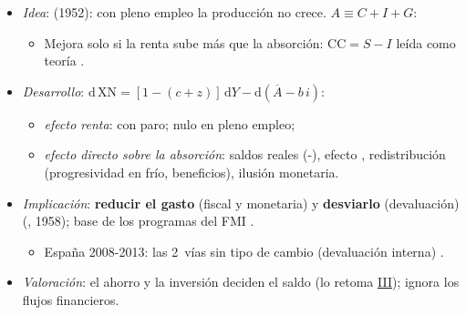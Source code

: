 \documentclass{article}
\begin{document}
\begin{columnas}
\begin{itemize}
\item \emph{Idea}:  (1952): con pleno empleo la producción no crece.  $A\equiv C+I+G$:
  \begin{itemize}
  \item Mejora solo si la renta sube más que la absorción: $\mathrm{CC}=S-I$ leída como teoría .
  \end{itemize}
\item \emph{Desarrollo}: $\mathrm d\,\mathrm{XN}=[1-(c+z)]\,\mathrm dY-\mathrm d(\overline A-b\,i)$:
  \begin{itemize}
  \item \emph{efecto renta}: con paro; nulo en pleno empleo;
  \item \emph{efecto directo sobre la absorción}: saldos reales (-), efecto , redistribución (progresividad en frío, beneficios), ilusión monetaria.
  \end{itemize}
\item \emph{Implicación}: \textbf{reducir el gasto} (fiscal y monetaria) y \textbf{desviarlo} (devaluación) (, 1958); base de los programas del FMI .
  \begin{itemize}
  \item España 2008-2013: las 2~vías sin tipo de cambio (devaluación interna)  .
  \end{itemize}
\item \emph{Valoración}: el ahorro y la inversión deciden el saldo (lo retoma \hyperref[rep:III]{III}); ignora los flujos financieros.
\end{itemize}


\end{columnas}
\end{document}
